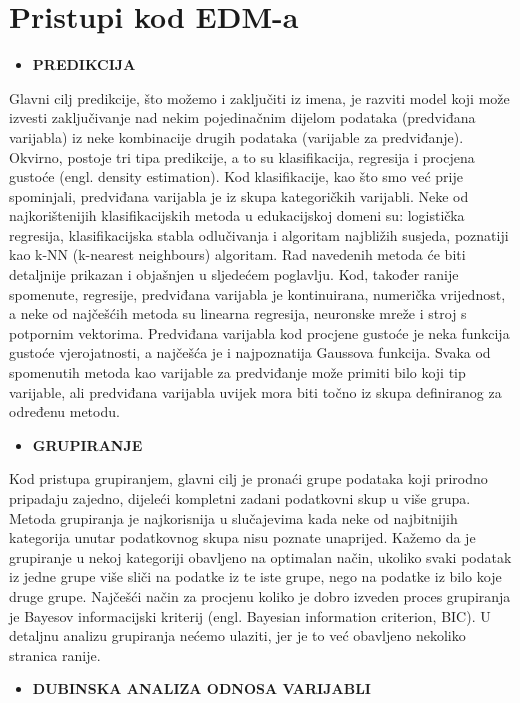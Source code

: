 \documentclass[times, utf8, zavrsni, numeric]{fer}
\begin{document}
\section{Pristupi kod EDM-a}
\begin{itemize}
\item \textbf{PREDIKCIJA}
\end{itemize}
Glavni cilj predikcije, što možemo i zaključiti iz imena, je razviti model koji može izvesti zaključivanje nad nekim pojedinačnim dijelom podataka (predviđana varijabla) iz neke kombinacije drugih podataka (varijable za predviđanje). Okvirno, postoje tri tipa predikcije, a to su klasifikacija, regresija i procjena gustoće (engl. density estimation). Kod klasifikacije, kao što smo već prije spominjali, predviđana varijabla je iz skupa kategoričkih varijabli. Neke od najkorištenijih klasifikacijskih metoda u edukacijskoj domeni su: logistička regresija, klasifikacijska stabla odlučivanja i algoritam najbližih susjeda, poznatiji kao k-NN (k-nearest neighbours) algoritam. Rad navedenih metoda će biti detaljnije prikazan i objašnjen u sljedećem poglavlju. Kod, također ranije spomenute, regresije, predviđana varijabla je kontinuirana, numerička vrijednost, a neke od najčešćih metoda su linearna regresija, neuronske mreže i stroj s potpornim vektorima. Predviđana varijabla kod procjene gustoće je neka funkcija gustoće vjerojatnosti, a najčešća je i najpoznatija Gaussova funkcija. Svaka od spomenutih metoda kao varijable za predviđanje može primiti bilo koji tip varijable, ali predviđana varijabla uvijek mora biti točno iz skupa definiranog za određenu metodu\cite{edm2}.
\begin{itemize}
\item \textbf{GRUPIRANJE}
\end{itemize}
Kod pristupa grupiranjem, glavni cilj je pronaći grupe podataka koji prirodno pripadaju zajedno, dijeleći kompletni zadani podatkovni skup u više grupa. Metoda grupiranja je najkorisnija u slučajevima kada neke od najbitnijih kategorija unutar podatkovnog skupa nisu poznate unaprijed. Kažemo da je grupiranje u nekoj kategoriji obavljeno na optimalan način, ukoliko svaki podatak iz jedne grupe više sliči na podatke iz te iste grupe, nego na podatke iz bilo koje druge grupe. Najčešći način za procjenu koliko je dobro izveden proces grupiranja je Bayesov informacijski kriterij (engl. Bayesian information criterion, BIC). U detaljnu analizu grupiranja nećemo ulaziti, jer je to već obavljeno nekoliko stranica ranije\cite{edm2}.

\begin{itemize}
\item \textbf{DUBINSKA ANALIZA ODNOSA VARIJABLI}
\end{itemize}
\end{document}
